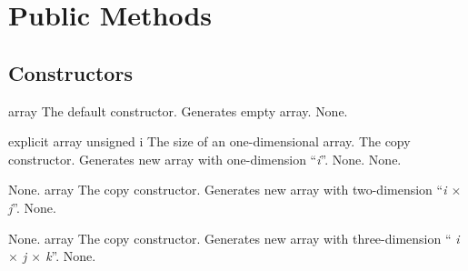 \clearpage

\section{Public Methods}

\subsection{Constructors}

\setNormalInstance
\printEmptyMethodReturn
{}
{array}
{The default constructor. Generates empty array.}
{None.}
\setCorrectWidthThree{4pt}

\setNormalInstance
\printMethodWithOneParam
{explicit}
{array}
{unsigned}
{i}
{The size of an one-dimensional array.}
{The copy constructor. Generates new array with one-dimension ``{\em i}''.}
{None.}
{None.}

\setNormalInstance
\setCorrectWidthThree{8pt}
\printMethodWithParamsSaved
{}
{None.}
{array}
{The copy constructor. Generates new array with two-dimension ``{\em i
$\times$ j}''.}
{None.}
\setCorrectWidthThree{4pt}

\setNormalInstance
\setCorrectWidthThree{8pt}
\printMethodWithParamsSaved
{}
{None.}
{array}
{The copy constructor. Generates new array with three-dimension ``{\em
i $\times$ j $\times$ k}''.}
{None.}
\setCorrectWidthThree{4pt}

\clearpage

